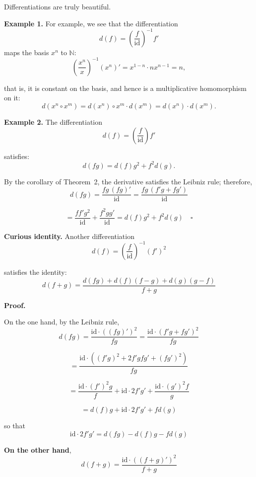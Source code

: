 \documentclass[12pt]{article}
\theoremstyle{definition}
\begin{document}
Differentiations are truly beautiful.

\vspace{10pt}
\noindent\textbf{Example 1.} For example, we see that the differentiation 
\[
d(f) = \left( \frac{f}{\mathrm{id}} \right)^{-1} f'
\]
maps the basis \(x^n\) to \(\mathbb{N}\):
\[
\left( \frac{x^n}{x} \right)^{-1} (x^n)' = x^{1-n} \cdot n x^{n-1} = n,
\]

that is, it is constant on the basis, and hence is a multiplicative homomorphism on it:
\[
d(x^n \circ x^m) = d(x^n) \circ x^m \cdot d(x^m) = d(x^n) \cdot d(x^m).
\]

\vspace{10pt}
\noindent\textbf{Example 2.} The differentiation 
\[
d(f) = \left( \frac{f}{\mathrm{id}} \right) f'
\]

\vspace{10pt}
satisfies:
\[
d(fg) = d(f) g^2 + f^2 d(g).
\]

\vspace{10pt}
By the corollary of Theorem~2, the derivative satisfies the Leibniz rule; therefore,
\[
d(fg) = \frac{fg \, (fg)'}{\mathrm{id}} = \frac{fg \, (f'g + fg')}{\mathrm{id}}
\]

\[
= \frac{ff' g^2}{\mathrm{id}} + \frac{f^2 gg'}{\mathrm{id}} = d(f) g^2 + f^2 d(g) \quad \square
\]

\vspace{20pt}
\noindent\textbf{Curious identity.} Another differentiation
\[
d(f) = \left( \frac{f}{\mathrm{id}} \right)^{-1} (f')^2
\]

satisfies the identity:
\[
d(f+g) = \frac{d(fg) + d(f)(f-g) + d(g)(g-f)}{f+g}
\]

\vspace{10pt}
\textbf{Proof.} 

\vspace{10pt}
On the one hand, by the Leibniz rule,
\[
d(fg) = \frac{\mathrm{id} \cdot ((fg)')^2}{fg} = \frac{\mathrm{id} \cdot (f'g + fg')^2}{fg}
\]

\[
= \frac{\mathrm{id} \cdot ((f'g)^2 + 2f'g f g' + (fg')^2)}{fg} 
\]

\[
= \frac{\mathrm{id} \cdot (f')^2 g}{f} + \mathrm{id} \cdot 2f'g' + \frac{\mathrm{id} \cdot (g')^2 f}{g}
\]

\[
= d(f)g + \mathrm{id} \cdot 2f'g' + f d(g)
\]

so that
\[
\mathrm{id} \cdot 2f'g' = d(fg) - d(f)g - f d(g)
\]

\newpage
\textbf{On the other hand},
\[
d(f+g) = \frac{\mathrm{id} \cdot ((f+g)')^2}{f+g}
\]
\end{document}
